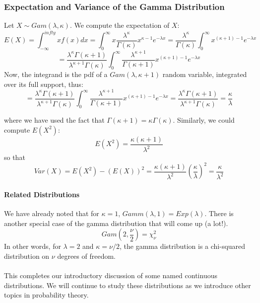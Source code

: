 \documentclass[12pt]{article} %
\begin{document}
\subsubsection{Expectation and Variance of the Gamma Distribution}
Let $X \sim Gam(\lambda,\kappa)$.  We compute the expectation of $X$:
$$E(X) = \int_{-\infty}^{infty}x f(x) dx = \int_0^\infty x \frac{\lambda^\kappa}{\Gamma(\kappa)}x^{\kappa-1} e^{-\lambda x} = \frac{\lambda^\kappa}{\Gamma(\kappa)}\int_0^\infty x^{(\kappa+1)-1} e^{-\lambda x}$$
$$ =  \frac{\lambda^\kappa\Gamma(\kappa+1)}{\lambda^{\kappa+1}\Gamma(\kappa)}\int_0^\infty \frac{\lambda^{\kappa+1}}{\Gamma(\kappa+1)}x^{(\kappa+1)-1} e^{-\lambda x}$$
Now, the integrand is the pdf of a $Gam(\lambda,\kappa+1)$ random variable, integrated over its full support, thus:
$$ =  \frac{\lambda^\kappa\Gamma(\kappa+1)}{\lambda^{\kappa+1}\Gamma(\kappa)}\int_0^\infty \frac{\lambda^{\kappa+1}}{\Gamma(\kappa+1)}x^{(\kappa+1)-1} e^{-\lambda x} = \frac{\lambda^\kappa\Gamma(\kappa+1)}{\lambda^{\kappa+1}\Gamma(\kappa)} = \frac{\kappa}{\lambda}$$

where we have used the fact that $\Gamma(\kappa+1) = \kappa\Gamma(\kappa)$. Similarly, we could compute $E(X^2)$:
$$E(X^2) = \frac{\kappa(\kappa+1)}{\lambda^2}$$
so that 
$$Var(X) = E(X^2)-\left(E(X)\right)^2 =   \frac{\kappa(\kappa+1)}{\lambda^2}\left(\frac{\kappa}{\lambda}\right)^2 = \frac{\kappa}{\lambda^2}$$
\paragraph{Related Distributions}
We have already noted that for $\kappa=1$, $Gamm(\lambda,1)=Exp(\lambda)$. There is another special case of the gamma distribution that will come up (a lot!).
$$Gam(2,\frac{\nu}2) =\chi^2_\nu$$
In other words, for $\lambda =2$ and $\kappa=\nu/2$, the gamma distribution is a chi-squared distribution on $\nu$ degrees of freedom.\\\\
This completes our introductory discussion of some named continuous distributions. We will continue to study these distributions as we introduce other topics in probability theory.
\end{document}
